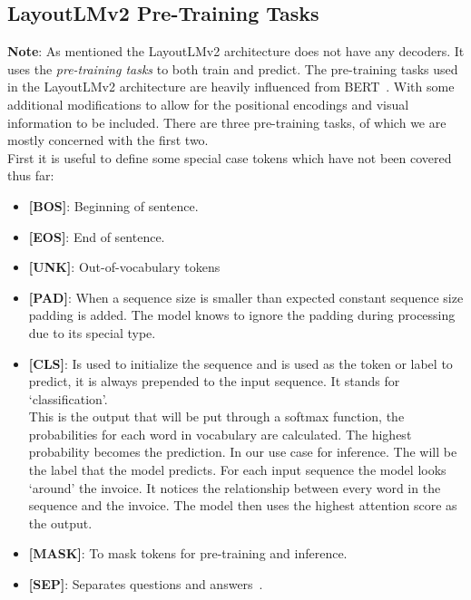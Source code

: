 \subsection{LayoutLMv2 Pre-Training Tasks}
\textbf{Note}: As mentioned the LayoutLMv2 architecture does not have any decoders. It uses the \emph{pre-training tasks}
to both train and predict.
\bigbreak
The pre-training tasks used in the LayoutLMv2 architecture are heavily influenced from BERT~\autocite{devlinBERTPretrainingDeep2019}.
With some additional modifications to allow for the positional encodings and visual information to be included.
There are three pre-training tasks, of which we are mostly concerned with the first two.\\
First it is useful to define some special case tokens which have not been covered
thus far:
\begin{itemize}
	\item \textbf{[BOS]}: Beginning of sentence.
	\item \textbf{[EOS]}: End of sentence.
	\item \textbf{[UNK]}: Out-of-vocabulary tokens
	\item \textbf{[PAD]}: When a sequence size is smaller than expected constant sequence size padding is added. The model
	      knows to ignore the padding during processing due to its special type.
	\item \textbf{[CLS]}: Is used to initialize the sequence and is used as the token or label to predict, it is always
	      prepended to the input sequence. It stands for `classification'.\\
	      This is the output that will be put through a softmax function, the probabilities for each word in
	      vocabulary are calculated. The highest probability becomes the prediction.
	      \bigbreak
	      In our use case for inference. The \code{[CLS]} will be the label that the model predicts. For each input sequence the model looks `around'
	      the invoice. It notices the relationship between every word in the sequence and the invoice. The model then uses the
	      highest attention score as the output.
	\item \textbf{[MASK]}: To mask tokens for pre-training and inference.
	\item \textbf{[SEP]}: Separates questions and answers~\autocite{devlinBERTPretrainingDeep2019}.
\end{itemize}
